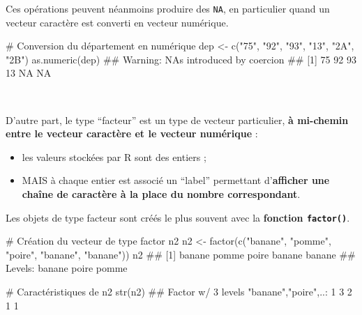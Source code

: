 \documentclass[12pt,twosided, notitlepage]{book}
\newenvironment{Shaded}{}{}
\newcommand{\CommentTok}[1]{\textcolor[rgb]{0.00,0.50,0.00}{#1}}
\newcommand{\KeywordTok}[1]{\textcolor[rgb]{0.00,0.00,1.00}{#1}}
\newcommand{\NormalTok}[1]{#1}
\newcommand{\StringTok}[1]{\textcolor[rgb]{0.00,0.50,0.50}{#1}}
\providecommand{\tightlist}{%
  \setlength{\itemsep}{0pt}\setlength{\parskip}{0pt}}
\renewenvironment{Shaded}{\begin{snugshade}}{\end{snugshade}}
\begin{document}
Ces opérations peuvent néanmoins produire des \texttt{NA}, en
particulier quand un vecteur caractère est converti en vecteur
numérique.

\begin{Shaded}
\begin{Highlighting}[]
\CommentTok{# Conversion du département en numérique}
\NormalTok{dep <-}\StringTok{ }\KeywordTok{c}\NormalTok{(}\StringTok{"75"}\NormalTok{, }\StringTok{"92"}\NormalTok{, }\StringTok{"93"}\NormalTok{, }\StringTok{"13"}\NormalTok{, }\StringTok{"2A"}\NormalTok{, }\StringTok{"2B"}\NormalTok{)}
\KeywordTok{as.numeric}\NormalTok{(dep)}
\NormalTok{  ## Warning: NAs introduced by coercion}
\NormalTok{  ## [1] 75 92 93 13 NA NA}
\end{Highlighting}
\end{Shaded}

~

D'autre part, le type \enquote{facteur} est un type de vecteur
particulier, \textbf{à mi-chemin entre le vecteur caractère et le
vecteur numérique} :

\begin{itemize}
\tightlist
\item
  les valeurs stockées par R sont des entiers ;
\item
  MAIS à chaque entier est associé un \enquote{label} permettant
  d'\textbf{afficher une chaîne de caractère à la place du nombre
  correspondant}.
\end{itemize}

Les objets de type facteur sont créés le plus souvent avec la
\textbf{fonction \texttt{factor()}}.

\begin{Shaded}
\begin{Highlighting}[]
\CommentTok{# Création du vecteur de type factor n2}
\NormalTok{n2 <-}\StringTok{ }\KeywordTok{factor}\NormalTok{(}\KeywordTok{c}\NormalTok{(}\StringTok{"banane"}\NormalTok{, }\StringTok{"pomme"}\NormalTok{, }\StringTok{"poire"}\NormalTok{, }\StringTok{"banane"}\NormalTok{, }\StringTok{"banane"}\NormalTok{))}
\NormalTok{n2}
\NormalTok{  ## [1] banane pomme  poire  banane banane}
\NormalTok{  ## Levels: banane poire pomme}

\CommentTok{# Caractéristiques de n2}
\KeywordTok{str}\NormalTok{(n2)}
\NormalTok{  ##  Factor w/ 3 levels "banane","poire",..: 1 3 2 1 1}
\end{Highlighting}
\end{Shaded}
\end{document}
